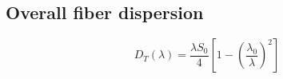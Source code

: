 \documentclass[12pt, onecolumn]{article}
\begin{document}
    \subsection{Overall fiber dispersion}
        \begin{equation}
            D_T(\lambda) = \displaystyle\frac{\lambda S_0}{4} \left[ 1 - \left(\displaystyle\frac{\lambda_0}{\lambda}\right)^2 \right]
            \label{eq:total_chromatic}
        \end{equation}
\end{document}
